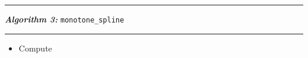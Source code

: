 \documentclass{article}
\begin{document}
\vspace{10pt}
\hrule
\vspace{3pt}
\noindent\textbf{\textit{Algorithm 3:}} \texttt{monotone\_spline}
\vspace{3pt}
\hrule

\begin{itemize}
  \itemsep0pt
  \parskip0pt

\item Compute
\end{itemize}






\end{document}
